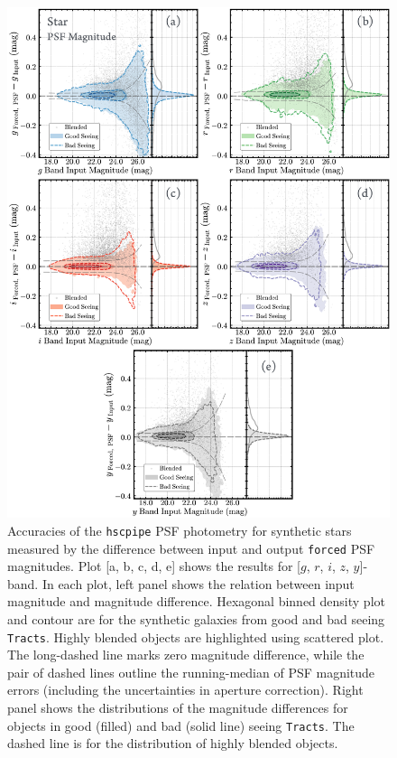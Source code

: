 \documentclass[useamsfonts]{pasj01}
\def\forced{\texttt{forced}}
\def\tracts{\texttt{Tracts}}
\begin{document}
\begin{figure}
    \begin{center}
        \includegraphics[width=16cm]{fig/synpipe_psf_mag}
    \end{center}
    \caption{
        Accuracies of the \texttt{hscpipe} PSF photometry for synthetic stars measured
        by the difference between input and output \forced{} PSF magnitudes.
        Plot [a, b, c, d, e] shows the results for [$g$, $r$, $i$, $z$, $y$]-band.
        In each plot, left panel shows the relation between input magnitude and
        magnitude difference.
        Hexagonal binned density plot and contour are for the synthetic galaxies from
        good and bad seeing \tracts{}.
        Highly blended objects are highlighted using scattered plot.
        The long-dashed line marks zero magnitude difference, while the pair of
        dashed lines outline the running-median of PSF magnitude errors
        (including the uncertainties in aperture correction).
        Right panel shows the distributions of the magnitude differences for objects
        in good (filled) and bad (solid line) seeing \tracts{}.
        The dashed line is for the distribution of highly blended objects.
        }
    \label{fig:psf_mag}
\end{figure}
\end{document}
